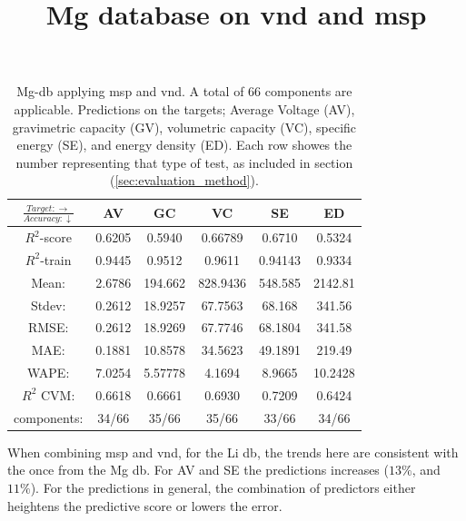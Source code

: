 \begin{table}[H]
\scriptsize
\centering
\caption{Mg-db applying msp and vnd. A total of 66 components are applicable. Predictions on the targets; Average Voltage (AV), gravimetric capacity (GV), volumetric capacity (VC), specific energy (SE), and energy density (ED). Each row showes the number representing that type of test, as included in section (\ref{sec:evaluation_method}).}
\title{Mg database on vnd and msp}
\begin{tabular}{|c|c|c|c|c|c|}
	\hline 
	$\frac{Target: \rightarrow}{Accuracy:\downarrow} $ & AV & GC & VC & SE & ED 
	 \\ 
	\hline
	$R^2$-score 	& 0.6205 & 0.5940 & 0.66789 & 0.6710 &  0.5324\\ 
	\hline 
	$R^2$-train 	& 0.9445 & 0.9512 & 0.9611 & 0.94143 &  0.9334 \\ 
	\hline
	Mean: 	 	& 2.6786	&194.662&828.9436& 548.585& 2142.81\\
	\hline 
	Stdev:	 	& 0.2612	&18.9257	&67.7563 	&68.168	& 341.56\\
	\hline 
	RMSE: 		&0.2612& 18.9269 &  67.7746 & 68.1804 &341.58\\ 
	\hline
	MAE: 		& 0.1881 & 10.8578& 34.5623 & 49.1891 & 219.49 \\ 
	\hline
	WAPE: 		& 7.0254 & 5.57778 & 4.1694  & 8.9665 & 10.2428 \\
	\hline
	$R^2$ CVM: 	& 0.6618 	& 0.6661 	& 0.6930  	& 0.7209 &0.6424 \\
	\hline
	components: 	& 34/66 	& 35/66 	& 35/66 	 & 33/66 	&34/66 \\
	\hline
\end{tabular}
\label{tab:mg-vnd-msp}
\end{table}

When combining msp and vnd, for the Li db, the trends here are consistent with the  once from the Mg db. For AV and SE the predictions increases ($13\%$, and $11\%$). For the predictions in general, the combination of predictors either heightens the predictive score or lowers the error. 


